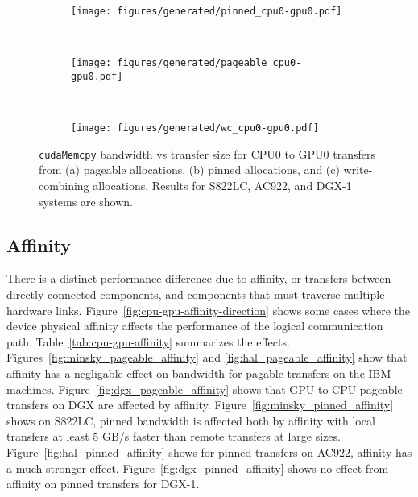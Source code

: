 \begin{figure}[ht]
    \centering
    \begin{subfigure}[b]{0.3\textwidth}
        \texttt{[image: figures/generated/pinned\_cpu0-gpu0.pdf]}
        \caption{}
        \label{fig:pinned-cpu0-gpu0}
    \end{subfigure}
    ~
    \begin{subfigure}[b]{0.3\textwidth}
        \texttt{[image: figures/generated/pageable\_cpu0-gpu0.pdf]}
        \caption{}
        \label{fig:pageable-cpu0-gpu0}
    \end{subfigure}
    ~
    \begin{subfigure}[b]{0.3\textwidth}
        \texttt{[image: figures/generated/wc\_cpu0-gpu0.pdf]}
        \caption{}
        \label{fig:wc-cpu0-gpu0}
    \end{subfigure}
    \caption[]{
        \texttt{cudaMemcpy} bandwidth vs transfer size for CPU0 to GPU0 transfers from 
        (a) pageable allocations,
        (b) pinned allocations, and
        (c) write-combining allocations.
        Results for S822LC, AC922, and DGX-1 systems are shown.
    }
    \label{fig:pageable-pinned-wc}
\end{figure}

\subsection{Affinity}
\label{sec:explicit-cpu-gpu-affinity}

There is a distinct performance difference due to affinity, or transfers between directly-connected components, and components that must traverse multiple hardware links.
Figure~\ref{fig:cpu-gpu-affinity-direction} shows some cases where the device physical affinity affects the performance of the logical communication path.
Table~\ref{tab:cpu-gpu-affinity} summarizes the effects.
Figures~\ref{fig:minsky_pageable_affinity} and \ref{fig:hal_pageable_affinity} show that affinity has a negligable effect on bandwidth for pagable transfers on the IBM machines.
Figure~\ref{fig:dgx_pageable_affinity} shows that GPU-to-CPU pageable transfers on DGX are affected by affinity.
Figure~\ref{fig:minsky_pinned_affinity} shows on S822LC, pinned bandwidth is affected both by affinity with local transfers at least $5$ GB/s faster than remote transfers at large sizes.
Figure~\ref{fig:hal_pinned_affinity} shows for pinned transfers on AC922, affinity has a much stronger effect.
Figure~\ref{fig:dgx_pinned_affinity} shows no effect from affinity on pinned transfers for DGX-1.

